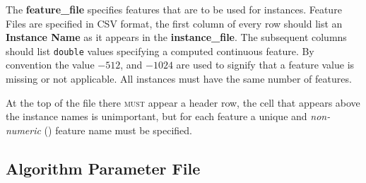 \documentclass[manual.tex]{subfiles}
\begin{document}
The \textbf{feature\_file} specifies features that are to be used for instances. Feature Files are specified in CSV format, the first column of every row should list an \textbf{Instance Name} as it appears in the \textbf{instance\_file}. The subsequent columns should list \texttt{double} values specifying a computed continuous feature. By convention the value $-512$, and $-1024$ are used to signify that a feature value is missing or not applicable. All instances must have the same number of features.

At the top of the file there \textsc{must} appear a header row, the cell that appears above the instance names is unimportant, but for each feature a unique and \emph{non-numeric} () feature name must be specified.

\subsection{Algorithm Parameter File} \label{sec:paramfile}

 
\end{document}
